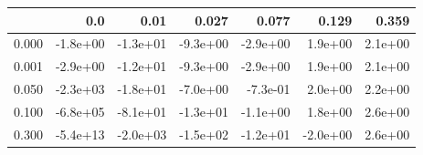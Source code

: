 \begin{tabular}{lrrrrrr}
\toprule
{} &      0.0 &     0.01 &    0.027 &    0.077 &    0.129 &   0.359 \\
\midrule
0.000 & -1.8e+00 & -1.3e+01 & -9.3e+00 & -2.9e+00 &  1.9e+00 & 2.1e+00 \\
0.001 & -2.9e+00 & -1.2e+01 & -9.3e+00 & -2.9e+00 &  1.9e+00 & 2.1e+00 \\
0.050 & -2.3e+03 & -1.8e+01 & -7.0e+00 & -7.3e-01 &  2.0e+00 & 2.2e+00 \\
0.100 & -6.8e+05 & -8.1e+01 & -1.3e+01 & -1.1e+00 &  1.8e+00 & 2.6e+00 \\
0.300 & -5.4e+13 & -2.0e+03 & -1.5e+02 & -1.2e+01 & -2.0e+00 & 2.6e+00 \\
\bottomrule
\end{tabular}
